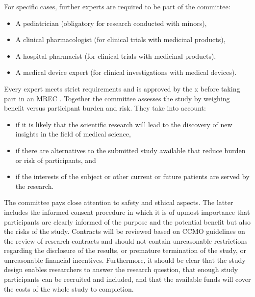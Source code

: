 \documentclass[authordate, empirical]{jote-new-article}
\begin{document}
For specific cases, further experts are required to be part of the committee:

	\begin{itemize}


		\item A pediatrician (obligatory for research conducted with minors),



		\item
		A clinical pharmacologist (for clinical trials with medicinal products),



		\item A hospital pharmacist (for clinical trials with medicinal products),



		\item
		A medical device expert (for clinical investigations with medical devices).


	\end{itemize}

	Every expert meets strict requirements and is approved by the x before taking part in an MREC \parencites{CCMO2020}. Together the committee assesses the study by weighing benefit versus participant burden and risk. They take into account:

	\begin{itemize}


		\item if it is likely that the scientific research will lead to the discovery of new insights in the field of medical science,



		\item
		if there are alternatives to the submitted study available that reduce burden or risk of participants, and



		\item if the interests of the subject or other current or future patients are served by the research.


	\end{itemize}

	The committee pays close attention to safety and ethical aspects. The latter includes the informed consent procedure in which it is of upmost importance that participants are clearly informed of the purpose and the potential benefit but also the risks of the study. Contracts will be reviewed based on CCMO guidelines on the review of research contracts \parencites{CCMO2011} and should not contain unreasonable restrictions regarding the disclosure of the results, or premature termination of the study, or unreasonable financial incentives. Furthermore, it should be clear that the study design enables researchers to answer the research question, that enough study participants can be recruited and included, and that the available funds will cover the costs of the whole study to completion.
\end{document}
